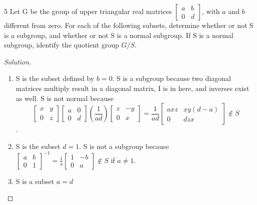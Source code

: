 \documentclass{article}
\newenvironment{solution}
{\renewcommand\qedsymbol{$\blacksquare$}\begin{proof}[Solution]}
{\end{proof}}
\begin{document}
\begin{PROB}{5}\label{Problem 5.}
    Let G be the group of upper triangular real matrices $\begin{bmatrix}
        a & b \\ 0 & d
    \end{bmatrix}$, with $a$ and $b$ different from zero. For each of the following subsets, determine whether or not S is a subgroup, and whether or not S is a normal subgroup. If S is a normal subgroup, identify the quotient group $G/S$.
\end{PROB}
\begin{solution}
    \begin{enumerate}{}
        \item S is the subset defined by $b = 0$.
        S is a subgroup because two diagonal matrices multiply result in a diagonal matrix, I is in here, and inverses exist as well. S is not normal because $$\begin{bmatrix}
            x & y \\ 0 & z
        \end{bmatrix}\begin{bmatrix}
            a & 0 \\ 0 & d
        \end{bmatrix}\left(\frac{1}{ad}\right)\begin{bmatrix}
            z & -y \\ 0 & x
        \end{bmatrix} = \frac{1}{ad}\begin{bmatrix}
            axz & xy(d-a) \\ 0 & dzx
        \end{bmatrix} \not \in S$$.

        \item S is the subset $d = 1$. 
        S is not a subgroup because $\begin{bmatrix}
            a & b \\ 0 & 1
        \end{bmatrix}^{-1} = \frac{1}{a}\begin{bmatrix}
            1 & -b \\ 0 & a
        \end{bmatrix} \not \in S$ if $a \neq 1$. 

        \item S is a subset $a = d$
        

\end{enumerate}
\end{solution}
\end{document}
